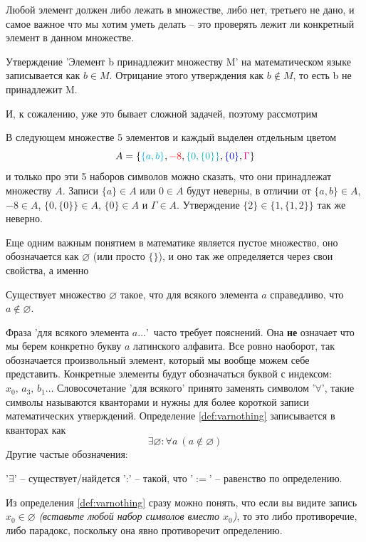 Любой элемент должен либо лежать в множестве, либо нет, третьего не дано, и самое важное что мы хотим уметь делать -- это проверять лежит ли конкретный элемент в данном множестве.
\begin{definition}
Утверждение 'Элемент b принадлежит множеству M' на математическом языке записывается как $b \in M$. Отрицание этого утверждения как $b \notin M$, то есть b не принадлежит M.
\end{definition}
И, к сожалению, уже это бывает сложной задачей, поэтому рассмотрим 
\begin{example}
В следующем множестве 5 элементов и каждый выделен отдельным цветом 
$$ A = \{ \textcolor{cyan}{\{a,b\}},\textcolor{red}{-8},\textcolor{phos}{\{0,\{0\}\}},\textcolor{blue}{\{0\}},\textcolor{magenta}{\Gamma} \} $$
и только про эти 5 наборов символов можно сказать, что они принадлежат множеству $A$. Записи $\{a\}\in A$ или $0\in A$ будут неверны, в отличии от $\{a,b\}\in A$, $-8\in A$, $\{0,\{0\}\}\in A$, $\{0\}\in A$ и $\Gamma\in A$. Утверждение $\{2\}\in \{1,\{1,2\}\}$ так же неверно.
\end{example}
Еще одним важным понятием в математике является пустое множество, оно обозначается как $\varnothing$ (или просто $\{\}$), и оно так же определяется через свои свойства, а именно
\begin{definition}\label{def:varnothing}
Существует множество $\varnothing$ такое, что для всякого элемента $a$ справедливо, что $a \notin \varnothing$.
\end{definition}
Фраза 'для всякого элемента $a\ldots$'\ часто требует пояснений. Она \textbf{не} означает что мы берем конкретно букву $a$ латинского алфавита. Все ровно наоборот, так обозначается произвольный элемент, который мы вообще можем себе представить. Конкретные элементы будут обозначаться буквой с индексом: $x_0,\,a_3,\,b_1\ldots$ Словосочетание 'для всякого' принято заменять символом '$\forall$', такие символы называются кванторами и нужны для более короткой записи математических утверждений. Определение \ref{def:varnothing} записывается в кванторах как
\[
\exists\varnothing: \forall a\ (a \notin \varnothing)
\]
Другие частые обозначения:
\begin{center}
'$\exists$' -- существует/найдется \quad ':' -- такой, что \quad '$:=$' -- равенство по определению. 
\end{center}
Из определения \ref{def:varnothing} сразу можно понять, что если вы видите запись $x_0 \in \varnothing$ \textit{(вставьте любой набор символов вместо $x_0$)}, то это либо противоречие, либо парадокс, поскольку она явно противоречит определению.
